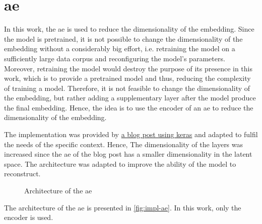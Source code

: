 \section{\acl{ae}}\label{subsec:impl-autoencoder}

In this work, the \ac{ae} is used to reduce the dimensionality of the \infersent{} embedding.
Since the \infersent{} model is pretrained, it is not possible to change the dimensionality of the embedding without a considerably big effort,
i.e. retraining the model on a sufficiently large data corpus and reconfiguring the model's parameters.
Moreover, retraining the model would destroy the purpose of its presence in this work, which is to provide a pretrained model and thus, 
reducing the complexity of training a model.
Therefore, it is not feasible to change the dimensionality of the \infersent{} embedding, but rather adding a supplementary layer after the model 
produce the final embedding.
Hence, the idea is to use the encoder of an \ac{ae} to reduce the dimensionality of the \infersent{} embedding.

The implementation was provided by 
\href{https://blog.paperspace.com/autoencoder-image-compression-keras/}{a blog post using keras}
and adapted to fulfil the needs of the specific context.
Hence, The dimensionality of the layers was increased since the \ac{ae} of the blog post has a smaller dimensionality in the latent space.
The architecture was adapted to improve the ability of the model to reconstruct.

%     

\begin{figure}[h] %
    \centering
    
    \caption{Architecture of the \ac{ae}}
    \label{fig:impl-ae}
\end{figure}

The architecture of the \ac{ae} is presented in \autoref{fig:impl-ae}.
In this work, only the encoder is used.